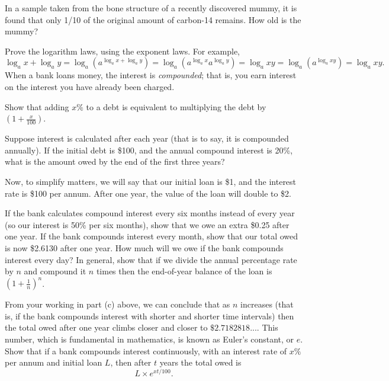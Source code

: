 \begin{questions}
\begin{parts}
            In a sample taken from the bone structure of a recently discovered mummy, it is found that only 1/10 of the original
            amount of carbon-14 remains. How old is the mummy?
    \end{parts}
  \question Prove the logarithm laws, using the exponent laws. For example,
            \begin{displaymath}
              \log_a x + \log_a y = \log_a (a^{\log_a x + \log_a y}) = \log_a (a^{\log_a x}a^{\log_a y}) = \log_a xy = \log_ a (a^{\log_a xy}) = \log_a xy.
            \end{displaymath}
  \question When a bank loans money, the interest is \emph{compounded}; that is, you earn interest on the interest you have already
            been charged.
    \begin{parts}
      \item Show that adding $ x\% $ to a debt is equivalent to multiplying the debt by $ (1 + \frac{x}{100}) $.
      \item Suppose interest is calculated after each year (that is to say, it is compounded annually). If the initial
            debt is \$100, and the annual compound interest is 20\%, what is the amount owed by the end of the first three years?
      \item Now, to simplify matters, we will say that our initial loan is \$1, and the interest rate is \$100 per annum. After
            one year, the value of the loan will double to \$2.
        \begin{subparts}
          \subpart If the bank calculates compound interest every six months instead of every year (so our interest is 50\% per
                   six months), show that we owe an extra \$0.25 after one year.
          \subpart If the bank compounds interest every month, show that our total owed is now \$2.6130 after one year.
          \subpart How much will we owe if the bank compounds interest every day?
          \subpart In general, show that if we divide the annual percentage rate by $ n $ and compound it $ n $ times then the end-of-year
                   balance of the loan is $ (1 + \frac{1}{n})^n $.
        \end{subparts}
      \item From your working in part (c) above, we can conclude that as $ n $ increases (that is, if the bank compounds interest with shorter
            and shorter time intervals) then the total owed after one year climbs closer and closer to $ \$2.7182818... $. This number, which
            is fundamental in mathematics, is known as Euler's constant, or $ e $. Show that if a bank compounds interest continuously, with an
            interest rate of $ x\% $ per annum and initial loan $ L $, then after $ t $ years the total owed is
            \begin{displaymath}
              L \times e^{xt/100}.
            \end{displaymath}


\end{parts}
\end{questions}
